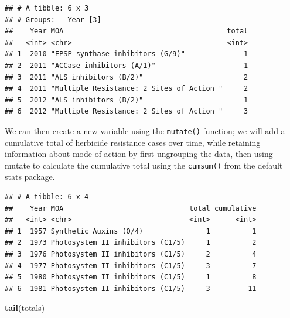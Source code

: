 \documentclass[letterpaper,]{book}
\newenvironment{Shaded}{\begin{snugshade}}{\end{snugshade}}
\newcommand{\DataTypeTok}[1]{\textcolor[rgb]{0.13,0.29,0.53}{#1}}
\newcommand{\KeywordTok}[1]{\textcolor[rgb]{0.13,0.29,0.53}{\textbf{#1}}}
\newcommand{\NormalTok}[1]{#1}
\newcommand{\OperatorTok}[1]{\textcolor[rgb]{0.81,0.36,0.00}{\textbf{#1}}}
\newcommand{\StringTok}[1]{\textcolor[rgb]{0.31,0.60,0.02}{#1}}
\begin{document}
\begin{verbatim}
## # A tibble: 6 x 3
## # Groups:   Year [3]
##    Year MOA                                       total
##   <int> <chr>                                     <int>
## 1  2010 "EPSP synthase inhibitors (G/9)"              1
## 2  2011 "ACCase inhibitors (A/1)"                     1
## 3  2011 "ALS inhibitors (B/2)"                        2
## 4  2011 "Multiple Resistance: 2 Sites of Action "     2
## 5  2012 "ALS inhibitors (B/2)"                        1
## 6  2012 "Multiple Resistance: 2 Sites of Action "     3
\end{verbatim}

We can then create a new variable using the \texttt{mutate()} function; we will add a cumulative total of herbicide resistance cases over time, while retaining information about mode of action by first ungrouping the data, then using mutate to calculate the cumulative total using the \texttt{cumsum()} from the default stats package.

\begin{Shaded}
\end{Shaded}

\begin{verbatim}
## # A tibble: 6 x 4
##    Year MOA                              total cumulative
##   <int> <chr>                            <int>      <int>
## 1  1957 Synthetic Auxins (O/4)               1          1
## 2  1973 Photosystem II inhibitors (C1/5)     1          2
## 3  1976 Photosystem II inhibitors (C1/5)     2          4
## 4  1977 Photosystem II inhibitors (C1/5)     3          7
## 5  1980 Photosystem II inhibitors (C1/5)     1          8
## 6  1981 Photosystem II inhibitors (C1/5)     3         11
\end{verbatim}

\begin{Shaded}
\begin{Highlighting}[]
\KeywordTok{tail}\NormalTok{(totals)}
\end{Highlighting}
\end{Shaded}
\end{document}
